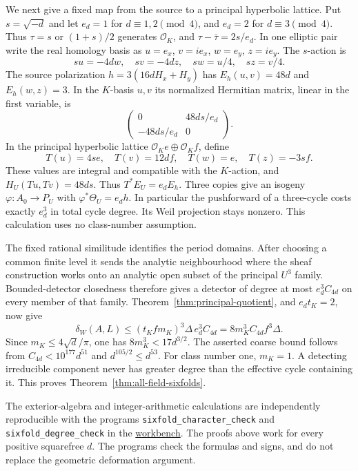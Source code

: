 We next give a fixed map from the source to a principal hyperbolic lattice. Put $s=\sqrt{-d}$ and let $e_d=1$ for $d\equiv1,2\pmod4$, and $e_d=2$ for $d\equiv3\pmod4$. Thus $\tau=s$ or $(1+s)/2$ generates $\mathcal O_K$, and $\tau-\bar\tau=2s/e_d$. In one elliptic pair write the real homology basis as $u=e_x$, $v=i e_x$, $w=e_y$, $z=i e_y$. The $s$-action is
\[
 su=-4dw,\quad sv=-4dz,\quad sw=u/4,\quad sz=v/4.
\]
The source polarization $h=3(16dH_x+H_y)$ has $E_h(u,v)=48d$ and $E_h(w,z)=3$. In the $K$-basis $u,v$ its normalized Hermitian matrix, linear in the first variable, is
\[
 \begin{pmatrix}0&48ds/e_d\\-48ds/e_d&0\end{pmatrix}.
\]
In the principal hyperbolic lattice $\mathcal O_K e\oplus\mathcal O_K f$, define
\[
 T(u)=4s e,\quad T(v)=12d f,\quad
 T(w)=e,\quad T(z)=-3s f.
\]
These values are integral and compatible with the $K$-action, and $H_U(Tu,Tv)=48ds$. Thus $T^*E_U=e_dE_h$. Three copies give an isogeny $\varphi:A_0\to P_U$ with $\varphi^*\Theta_U=e_dh$. In particular the pushforward of a three-cycle costs exactly $e_d^3$ in total cycle degree. Its Weil projection stays nonzero. This calculation uses no class-number assumption.

The fixed rational similitude identifies the period domains. After choosing a common finite level it sends the analytic neighbourhood where the sheaf construction works onto an analytic open subset of the principal $U^3$ family. Bounded-detector closedness therefore gives a detector of degree at most $e_d^3C_{4d}$ on every member of that family. Theorem~\ref{thm:principal-quotient}, and $e_dt_K=2$, now give
\[
 \delta_W(A,L)\le(t_Kfm_K)^3\Delta\,e_d^3C_{4d}
                 =8m_K^3C_{4d}f^3\Delta.
\]
Since $m_K\le4\sqrt d/\pi$, one has $8m_K^3<17d^{3/2}$. The asserted coarse bound follows from $C_{4d}<10^{177}d^{51}$ and $d^{105/2}\le d^{53}$. For class number one, $m_K=1$. A detecting irreducible component never has greater degree than the effective cycle containing it. This proves Theorem~\ref{thm:all-field-sixfolds}.

The exterior-algebra and integer-arithmetic calculations are independently reproducible with the programs \texttt{sixfold\_character\_check} and \texttt{sixfold\_degree\_check} in the \href{\workbenchurl}{workbench}. The proofs above work for every positive squarefree $d$. The programs check the formulas and signs, and do not replace the geometric deformation argument.
